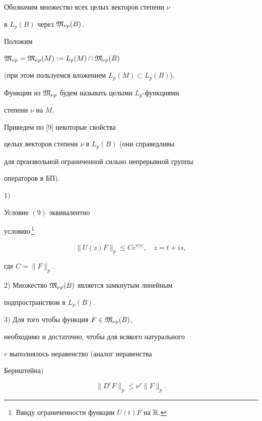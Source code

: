 Обозначим множество всех целых векторов степени $\nu$


в $L_p(B)$ через $\frak M_{\nu p}(B)$.





Положим


$\frak M_{\nu p}=\frak M_{\nu p}(M):=L_p(M)\cap\frak M_{\nu p}(B)$


(при этом пользуемся вложением $L_p(M)\subset L_p(B)$).


Функции из $\frak M_{\nu p}$ будем называть целыми $L_p$-функциями


степени $\nu$ на $M$.





Приведем по [9] некоторые свойства


целых векторов степени $\nu$ в $L_p(B)$ (они справедливы


для произвольной ограниченной сильно непрерывной группы


операторов в БП).





\begin{prop}


$1)$ 


Условие $(9)$ эквивалентно


условию\,\footnote{Ввиду ограниченности функции $U(t)F$ на $\Bbb R$.}


$$


\|U(z)F\|_p\le Ce^{\nu|s|},\quad z=t+is,


$$


где $C=\|F\|_p$.





$2)$ Множество $\frak M_{\nu p}(B)$ является замкнутым линейным


подпространством в $L_p(B)$.





$3)$ Для того чтобы функция $F\in\frak M_{\nu p}(B)$,


необходимо и достаточно, чтобы для всякого натурального


$r$ выполнялось неравенство $($аналог неравенства


Бернштейна$)$


\begin{equation}


\|D^rF\|_p\le\nu^r\|F\|_p.


\end{equation}


\end{prop}





